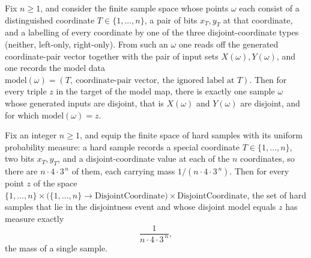 \begin{theorem}
\label{CommunicationComplexity.Functions.Disjointness.RandomizedLowerBound.card_disjointEvent_inter_disjointModel_fiber}
\leanok
{}
Fix $n \ge 1$, and consider the finite sample space whose points $\omega$ each consist
of a distinguished coordinate $T \in \{1,\dots,n\}$, a pair of bits $x_T, y_T$ at that
coordinate, and a labelling of every coordinate by one of the three disjoint-coordinate
types (neither, left-only, right-only). From such an $\omega$ one reads off the
generated coordinate-pair vector together with the pair of input sets $X(\omega),
Y(\omega)$, and one records the model data $\mathrm{model}(\omega) = (T,\
\text{coordinate-pair vector},\ \text{the ignored label at } T)$. Then for every triple
$z$ in the target of the model map, there is exactly one sample $\omega$ whose generated
inputs are disjoint, that is $X(\omega)$ and $Y(\omega)$ are disjoint, and for which
$\mathrm{model}(\omega) = z$.
\end{theorem}

\begin{theorem}
\label{CommunicationComplexity.Functions.Disjointness.RandomizedLowerBound.measureReal_disjointEvent_inter_disjointModel_fiber}
\leanok
{}
\difficulty{3}
Fix an integer $n \ge 1$, and equip the finite space of hard samples with its uniform
probability measure: a hard sample records a special coordinate $T \in \{1,\dots,n\}$,
two bits $x_T, y_T$, and a disjoint-coordinate value at each of the $n$ coordinates, so
there are $n\cdot 4\cdot 3^{\,n}$ of them, each carrying mass $1/(n\cdot 4\cdot
3^{\,n})$. Then for every point $z$ of the space
$\{1,\dots,n\}\times\big(\{1,\dots,n\}\to \text{DisjointCoordinate}\big)\times
\text{DisjointCoordinate}$, the set of hard samples that lie in the disjointness event
and whose disjoint model equals $z$ has measure exactly
\[
\frac{1}{n\cdot 4\cdot 3^{\,n}},
\]
the mass of a single sample.
\end{theorem}

